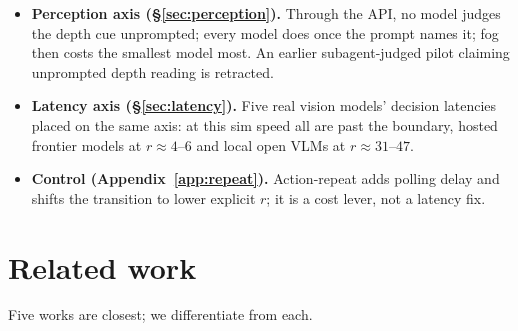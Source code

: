 \documentclass[11pt]{article}
\begin{document}
\begin{itemize}
    regimes are a deliberation stall: 10--32\,s calls on the frame just
    before the window, against 2.6\,s everywhere else. At low effort the
    stall is gone and the same frames are misjudged instead: 58/72 early
    commits, 8/72 cleared.
  \item \textbf{Perception axis (\S\ref{sec:perception}).} Through the API,
    no model judges the depth cue unprompted; every model does once the
    prompt names it; fog then costs the smallest model most. An earlier
    subagent-judged pilot claiming unprompted depth reading is retracted.
  \item \textbf{Latency axis (\S\ref{sec:latency}).} Five real vision models'
    decision latencies placed on the same axis: at this sim speed all are
    past the boundary, hosted frontier models at $r \approx 4$--$6$ and local
    open VLMs at $r \approx 31$--$47$.
  \item \textbf{Control (Appendix~\ref{app:repeat}).} Action-repeat adds
    polling delay and shifts the transition to lower explicit $r$; it is a
    cost lever, not a latency fix.
\end{itemize}

\section{Related work}

Five works are closest; we differentiate from each.
\end{document}
